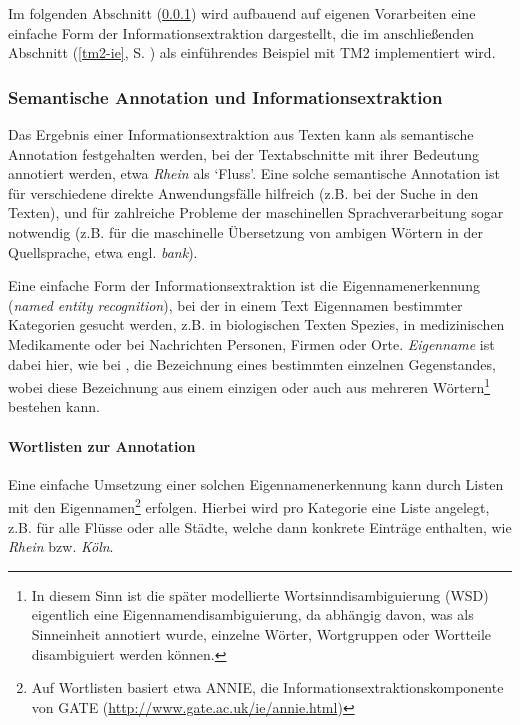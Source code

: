 \documentclass[abstracton, 12pt]{scrartcl}
\begin{document}
Im folgenden Abschnitt (\ref{chapter-semantische-annotation}) wird aufbauend auf eigenen Vorarbeiten \citep{Steeg2007} eine einfache Form der Informationsextraktion dargestellt, die im anschließenden Abschnitt (\ref{tm2-ie}, S. \pageref{tm2-ie}) als einführendes Beispiel mit TM2 implementiert wird.

\subsubsection{Semantische Annotation und Informationsextraktion} \label{chapter-semantische-annotation} \label{eigennamen} 

Das Ergebnis einer Informationsextraktion aus Texten kann als semantische Annotation festgehalten werden, bei der Textabschnitte mit ihrer Bedeutung annotiert werden, etwa \emph{Rhein} als `Fluss'. Eine solche semantische Annotation ist für verschiedene direkte Anwendungsfälle hilfreich (z.B. bei der Suche in den Texten), und für zahlreiche Probleme der maschinellen Sprachverarbeitung sogar notwendig (z.B. für die maschinelle Übersetzung von ambigen Wörtern in der Quellsprache, etwa engl. \emph{bank}).

Eine einfache Form der Informationsextraktion ist die Eigennamenerkennung (\emph{named entity recognition}), bei der in einem Text Eigennamen bestimmter Kategorien gesucht werden, z.B. in biologischen Texten Spezies, in medizinischen Medikamente oder bei Nachrichten Personen, Firmen oder Orte. \emph{Eigenname} ist dabei hier, wie bei \citet[27]{Frege1892}, die Bezeichnung eines bestimmten einzelnen Gegenstandes, wobei diese Bezeichnung aus einem einzigen oder auch aus mehreren Wörtern\footnote{In diesem Sinn ist die später modellierte Wortsinndisambiguierung (WSD) eigentlich eine Eigennamendisambiguierung, da abhängig davon, was als Sinneinheit annotiert wurde, einzelne Wörter, Wortgruppen oder Wortteile disambiguiert werden können.} bestehen kann.

\paragraph{Wortlisten zur Annotation}  

Eine einfache Umsetzung einer solchen Eigennamenerkennung kann durch Listen mit den Eigennamen\footnote{Auf Wortlisten basiert etwa ANNIE, die Informationsextraktionskomponente von GATE (\url{http://www.gate.ac.uk/ie/annie.html})} erfolgen. Hierbei wird pro Kategorie eine Liste angelegt, z.B. für alle Flüsse oder alle Städte, welche dann konkrete Einträge enthalten, wie \emph{Rhein} bzw. \emph{Köln}.
\end{document}
